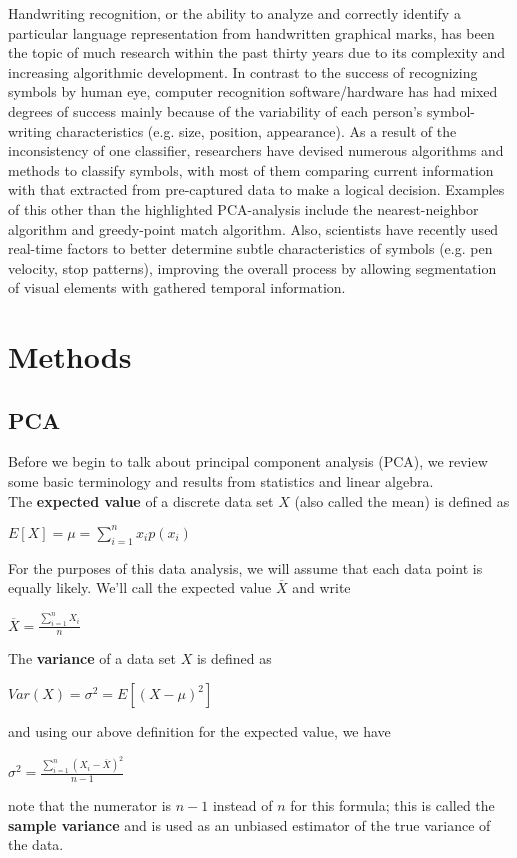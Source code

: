 \documentclass[twocolumn]{article}
\begin{document}
Handwriting recognition, or the ability to analyze and correctly identify a particular language representation from handwritten graphical marks, has been the topic of much research within the past thirty years due to its complexity and increasing algorithmic development. In contrast to the success of recognizing symbols by human eye, computer recognition software/hardware has had mixed degrees of success mainly because of the variability of each person's symbol-writing characteristics (e.g. size, position, appearance). As a result of the inconsistency of one classifier, researchers have devised numerous algorithms and methods to classify symbols, with most of them comparing current information with that extracted from pre-captured data to make a logical decision. Examples of this other than the highlighted PCA-analysis include the nearest-neighbor algorithm and greedy-point match algorithm. Also, scientists have recently used real-time factors to better determine subtle characteristics of symbols (e.g. pen velocity, stop patterns), improving the overall process by allowing segmentation of visual elements with gathered temporal information. 
\section{Methods} %
\label{sec:methods}

\subsection{PCA} %
\label{subsec:pca}
Before we begin to talk about principal component analysis (PCA), we review some basic terminology and results from statistics and linear algebra.\\
The \textbf{expected value} of a discrete data set $X$ (also called the mean) is defined as
\begin{center}
$\displaystyle E[X] = \mu =  \sum_{i=1}^{n}x_ip(x_i)$
\end{center}
For the purposes of this data analysis, we will assume that each data point is equally likely. We'll call the expected value 
$\overline{X}$ and write
\begin{center}
$\displaystyle \overline{X} = \frac{\sum_{i=1}^{n}X_i}{n}$
\end{center}
The \textbf{variance} of a data set $X$ is defined as
\begin{center}
$\displaystyle Var(X) = \sigma^2 = E\left[\left(X-\mu\right)^2\right]$
\end{center} 
and using our above definition for the expected value, we have
\begin{center}
$\displaystyle \sigma^2 = 
\frac{\sum_{i=1}^{n}(X_i - \overline{X})^2}{n-1}$
\end{center}
note that the numerator is $n-1$ instead of $n$ for this formula; this is called the \textbf{sample variance} and is used as an unbiased estimator of the true variance of the data.
\end{document}
